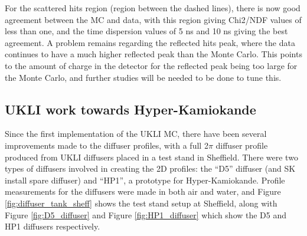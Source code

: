 For the scattered hits region (region between the dashed lines), there is now good agreement between the MC and data, with this region giving Chi2/NDF values of less than one, and the time dispersion values of 5 ns and 10 ns giving the best agreement. A problem remains regarding the reflected hits peak, where the data continues to have a much higher reflected peak than the Monte Carlo. This points to the amount of charge in the detector for the reflected peak being too large for the Monte Carlo, and further studies will be needed to be done to tune this.


\subsection{UKLI work towards Hyper-Kamiokande}

Since the first implementation of the UKLI MC, there have been several improvements made to the diffuser profiles, with a full 2$\pi$ diffuser profile produced from UKLI diffusers placed in a test stand in Sheffield. There were two types of diffusers involved in creating the 2D profiles: the ``D5'' diffuser (and SK install spare diffuser) and ``HP1'', a prototype for Hyper-Kamiokande. Profile measurements for the diffusers were made in both air and water, and Figure \ref{fig:diffuser_tank_sheff} shows the test stand setup at Sheffield, along with Figure \ref{fig:D5_diffuser} and Figure \ref{fig:HP1_diffuser} which show the D5 and HP1 diffusers respectively.



